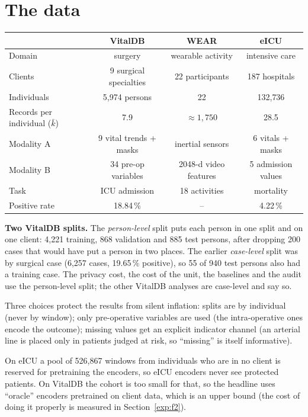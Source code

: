 \documentclass[11pt,a4paper]{article}
\begin{document}
\section{The data}\label{sec:data}

\begin{center}
\small
\begin{tabular}{lccc}
\toprule
& VitalDB & WEAR & eICU \\
\midrule
Domain & surgery & wearable activity & intensive care \\
Clients & 9 surgical specialties & 22 participants & 187 hospitals \\
Individuals & 5{,}974 persons & 22 & 132{,}736 \\
Records per individual ($\bar k$) & 7.9 & $\approx 1{,}750$ & 28.5 \\
Modality A & 9 vital trends + masks & inertial sensors & 6 vitals + masks \\
Modality B & 34 pre-op variables & 2048-d video features & 5 admission values \\
Task & ICU admission & 18 activities & mortality \\
Positive rate & 18.84\,\% & -- & 4.22\,\% \\
\bottomrule
\end{tabular}
\end{center}

\textbf{Two VitalDB splits.} The \emph{person-level} split puts each person in
one split and on one client: 4{,}221 training, 868 validation and 885 test
persons, after dropping 200 cases that would have put a person in two places.
The earlier \emph{case-level} split was by surgical case (6{,}257 cases,
19.65\,\% positive), so 55 of 940 test persons also had a training case. The
privacy cost, the cost of the unit, the baselines and the audit use the
person-level split; the other VitalDB analyses are case-level and say so.

Three choices protect the results from silent inflation: splits are by
individual (never by window); only pre-operative variables are used (the
intra-operative ones encode the outcome); missing values get an explicit
indicator channel (an arterial line is placed only in patients judged at risk,
so ``missing'' is itself informative).

On eICU a pool of 526{,}867 windows from individuals who are in no client is
reserved for pretraining the encoders, so eICU encoders never see protected
patients. On VitalDB the cohort is too small for that, so the headline uses
``oracle'' encoders pretrained on client data, which is an upper bound (the
cost of doing it properly is measured in Section~\ref{exp:f2}).
\end{document}
